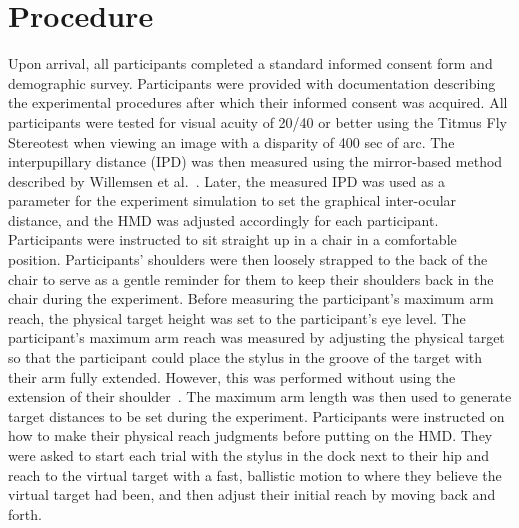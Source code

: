 \section{Procedure}
Upon arrival, all participants completed a standard informed consent form and demographic survey. Participants were provided with documentation describing the experimental procedures after which their informed consent was acquired. All participants were tested for visual acuity of 20/40 or better using the Titmus Fly Stereotest when viewing an image with a disparity of 400 sec of arc. The interpupillary distance (IPD) was then measured using the mirror-based method described by Willemsen et al.~\cite{WGT+08}. Later, the measured IPD was used as a parameter for the experiment simulation to set the graphical inter-ocular distance, and the HMD was adjusted accordingly for each participant. Participants were instructed to sit straight up in a chair in a comfortable position. Participants' shoulders were then loosely strapped to the back of the chair to serve as a gentle reminder for them to keep their shoulders back in the chair during the experiment. Before measuring the participant's maximum arm reach, the physical target height was set to the participant's eye level. The participant's maximum arm reach was measured by adjusting the physical target so that the participant could place the stylus in the groove of the target with their arm fully extended. However, this was performed without using the extension of their shoulder~\cite{ANL+12}. The maximum arm length was then used to generate target distances to be set during the experiment. Participants were instructed on how to make their physical reach judgments before putting on the HMD. They were asked to start each trial with the stylus in the dock next to their hip and reach to the virtual target with a fast, ballistic motion to where they believe the virtual target had been, and then adjust their initial reach by moving back and forth. 

